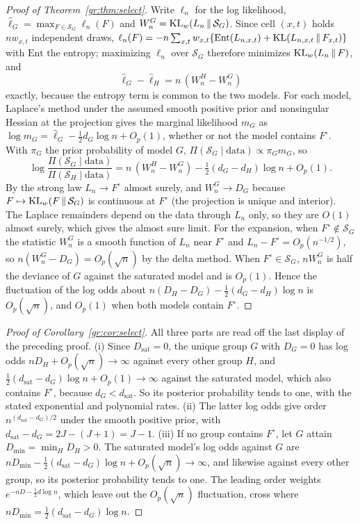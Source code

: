 \begin{proof}[Proof of Theorem~\ref{gr:thm:select}]
Write $\ell_n$ for the log likelihood, $\hat\ell_G=\max_{F\in\mathcal S_G}\ell_n(F)$ and $W_n^G=\mathrm{KL}_w(L_n\,\|\,\mathcal S_G)$. Since cell $(x,t)$ holds $nw_{x,t}$ independent draws, $\ell_n(F)=-n\sum_{x,t}w_{x,t}\{\mathrm{Ent}(L_{n,x,t})+\mathrm{KL}(L_{n,x,t}\,\|\,F_{x,t})\}$ with $\mathrm{Ent}$ the entropy; maximizing $\ell_n$ over $\mathcal S_G$ therefore minimizes $\mathrm{KL}_w(L_n\,\|\,F)$, and
\[
\hat\ell_G-\hat\ell_H=n\,(W_n^H-W_n^G)
\]
exactly, because the entropy term is common to the two models. For each model, Laplace's method under the assumed smooth positive prior and nonsingular Hessian at the projection gives the marginal likelihood $m_G$ as $\log m_G=\hat\ell_G-\tfrac12d_G\log n+O_p(1)$, whether or not the model contains $F^{\circ}$. With $\pi_G$ the prior probability of model $G$, $\Pi(\mathcal S_G\mid\text{data})\propto\pi_Gm_G$, so
\[
\log\frac{\Pi(\mathcal S_G\mid\text{data})}{\Pi(\mathcal S_H\mid\text{data})}=n\,(W_n^H-W_n^G)-\tfrac12(d_G-d_H)\log n+O_p(1).
\]
By the strong law $L_n\to F^{\circ}$ almost surely, and $W_n^G\to D_G$ because $F\mapsto\mathrm{KL}_w(F\,\|\,\mathcal S_G)$ is continuous at $F^{\circ}$ (the projection is unique and interior). The Laplace remainders depend on the data through $L_n$ only, so they are $O(1)$ almost surely, which gives the almost sure limit. For the expansion, when $F^{\circ}\notin\mathcal S_G$ the statistic $W_n^G$ is a smooth function of $L_n$ near $F^{\circ}$ and $L_n-F^{\circ}=O_p(n^{-1/2})$, so $n(W_n^G-D_G)=O_p(\sqrt n)$ by the delta method. When $F^{\circ}\in\mathcal S_G$, $nW_n^G$ is half the deviance of $G$ against the saturated model and is $O_p(1)$. Hence the fluctuation of the log odds about $n(D_H-D_G)-\frac12(d_G-d_H)\log n$ is $O_p(\sqrt n)$, and $O_p(1)$ when both models contain $F^{\circ}$.
\end{proof}

\begin{proof}[Proof of Corollary~\ref{gr:cor:select}]
All three parts are read off the last display of the preceding proof. (i) Since $D_{\mathrm{sat}}=0$, the unique group $G$ with $D_G=0$ has log odds $nD_H+O_p(\sqrt n)\to\infty$ against every other group $H$, and $\tfrac12(d_{\mathrm{sat}}-d_G)\log n+O_p(1)\to\infty$ against the saturated model, which also contains $F^{\circ}$, because $d_G<d_{\mathrm{sat}}$. So its posterior probability tends to one, with the stated exponential and polynomial rates. (ii) The latter log odds give order $n^{(d_{\mathrm{sat}}-d_G)/2}$ under the smooth positive prior, with $d_{\mathrm{sat}}-d_G=2J-(J+1)=J-1$. (iii) If no group contains $F^{\circ}$, let $G$ attain $D_{\min}=\min_HD_H>0$. The saturated model's log odds against $G$ are $nD_{\min}-\tfrac12(d_{\mathrm{sat}}-d_G)\log n+O_p(\sqrt n)\to\infty$, and likewise against every other group, so its posterior probability tends to one. The leading order weights $e^{-nD-\frac12d\log n}$, which leave out the $O_p(\sqrt n)$ fluctuation, cross where $nD_{\min}=\tfrac12(d_{\mathrm{sat}}-d_G)\log n$.
\end{proof}

